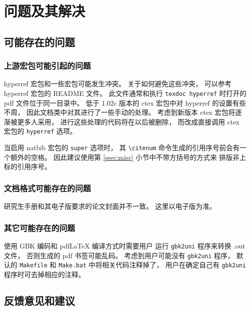 
\chapter{问题及其解决}
	\section{可能存在的问题}
		\subsection{上游宏包可能引起的问题}

		hyperref 宏包和一些宏包可能发生冲突。
		关于如何避免这些冲突，
		可以参考 hyperref 宏包的 README 文件。
		此文件通常和执行 \verb|texdoc hyperref| %
		时打开的 pdf 文件位于同一目录中。
		低于 1.02c 版本的 ctex 宏包中对 hyperref 的设置有些不周，
		因此文档类中对其进行了一些手动的处理。
		考虑到新版本 ctex 宏包将逐渐被更多人采用，
		进行这些处理的代码将在以后被删除，
		而改成直接调用 ctex 宏包的 \verb|hyperref| 选项。

		当启用 natbib 宏包的 \verb|super| 选项时，
		其 \verb|\citenum| 命令生成的引用序号前会有一个额外的空格。
		因此建议使用第 \ref{ssec:misc} 小节中不带方括号的方式来%
		排版非上标的引用序号。

		\subsection{文档格式可能存在的问题}

		研究生手册和其电子版\cite{pku-thesisstyle}要求的论文封面并不一致。
		这里以电子版为准。

		\subsection{其它可能存在的问题}

		使用 GBK 编码和 pdf\LaTeX{} 编译方式时需要用户%
		运行 \verb|gbk2uni| 程序来转换 .out 文件，
		否则生成的 pdf 书签可能乱码。
		考虑到用户可能没有 \verb|gbk2uni| 程序，
		默认的 \verb|Makefile| 和 \verb|Make.bat| 中将相关代码注释掉了，
		用户在确定自己有 \verb|gbk2uni| 程序时可去掉相应的注释。

	\section{反馈意见和建议}

